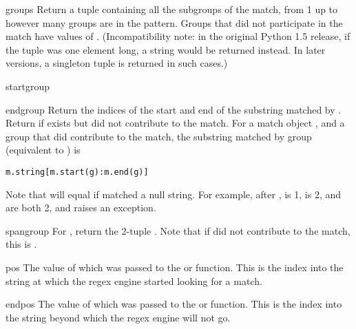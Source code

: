 \begin{funcdesc}{groups}{}
Return a tuple containing all the subgroups of the match, from 1 up to
however many groups are in the pattern.  Groups that did not
participate in the match have values of .  (Incompatibility 
note: in the original Python 1.5 release, if the tuple was one element
long, a string would be returned instead.  In later versions, a
singleton tuple is returned in such cases.)
\end{funcdesc}

\begin{funcdesc}{start}{group}
\end{funcdesc}

\begin{funcdesc}{end}{group}
Return the indices of the start and end of the substring
matched by .  Return  if  exists but
did not contribute to the match.  For a match object
, and a group  that did contribute to the match, the
substring matched by group  (equivalent to
) is

\begin{verbatim}
m.string[m.start(g):m.end(g)]
\end{verbatim}

Note that
 will equal  if
 matched a null string.  For example, after ,  is 1,
 is 2,  and
 are both 2, and  raises
an  exception.

\end{funcdesc}

\begin{funcdesc}{span}{group}
For  , return the 2-tuple
.
Note that if  did not contribute to the match, this is
.
\end{funcdesc}

\begin{datadesc}{pos}
The value of  which was passed to the
 or  function.  This is the index into
the string at which the regex engine started looking for a match. 
\end{datadesc}

\begin{datadesc}{endpos}
The value of  which was passed to the
 or  function.  This is the index into
the string beyond which the regex engine will not go.
\end{datadesc}

